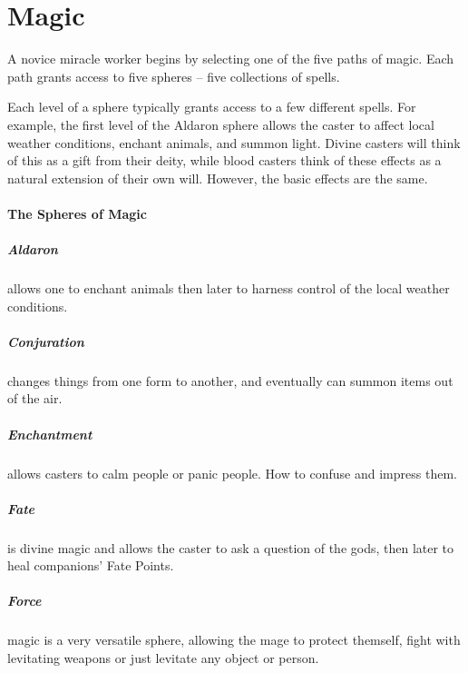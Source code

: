 \chapter{Magic}

\begin{multicols}{2}

\noindent
A novice miracle worker begins by selecting one of the five paths of magic.
Each path grants access to five spheres -- five collections of spells.

Each level of a sphere typically grants access to a few different spells.
For example, the first level of the Aldaron sphere allows the caster to affect local weather conditions, enchant animals, and summon light.
Divine casters will think of this as a gift from their deity, while blood casters think of these effects as a natural extension of their own will.
However, the basic effects are the same.

\subsubsection{The Spheres of Magic}

\paragraph{Aldaron} allows one to enchant animals then later to harness control of the local weather conditions.

\paragraph{Conjuration} changes things from one form to another, and eventually can summon items out of the air.

\paragraph{Enchantment} allows casters to calm people or panic people. How to confuse and impress them.

\paragraph{Fate} is divine magic and allows the caster to ask a question of the gods, then later to heal companions' Fate Points.

\paragraph{Force} magic is a very versatile sphere, allowing the mage to protect themself, fight with levitating weapons or just levitate any object or person.


\end{multicols}
